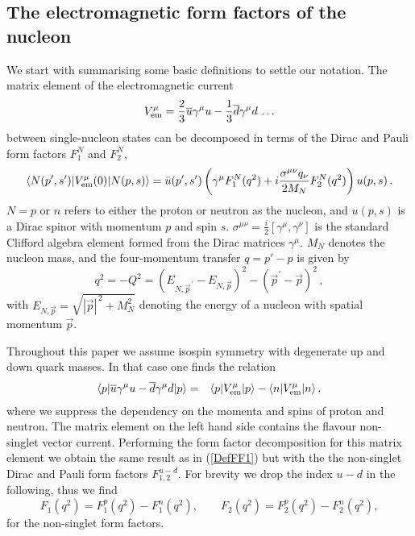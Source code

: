 \documentclass[11pt,prd,aps,showpacs,eqsecnum,floatfix,nofootinbib,preprint,tightenlines]{revtex4}
\newcommand{\pref}[1]{(\ref{#1})}
\begin{document}
\subsection{The electromagnetic form factors of the nucleon}
We start with summarising some basic definitions to settle our notation.
The matrix element of the electromagnetic current 
\begin{equation}
V^{\mu}_{\rm em} = \frac{2}{3} \overline{u}\gamma^{\mu}u - \frac{1}{3} \overline{d}\gamma^{\mu}d\,\ldots 
\end{equation}
between single-nucleon states can be decomposed in terms of the Dirac and Pauli form factors $F^N_1$ and $F^N_2$,
\begin{equation}\label{DefFF1}
\langle N(p',s')|V^{\mu}_{\rm em}(0)|N(p,s)\rangle = \bar{u}(p',s')\left(\gamma^{\mu}F^N_{1}(q^2) + i \frac{\sigma^{\mu\nu} q_{\nu}}{2M_N}F^N_2(q^2)\right)u(p,s)\,.
\end{equation}
$N=p$ or $n$ refers to either the proton or neutron as the nucleon, and $u(p,s)$ is a Dirac spinor with momentum $p$ and spin $s$. $\sigma^{\mu\nu}=\frac{i}{2}[\gamma^{\mu},\gamma^{\nu}]$ is the standard Clifford algebra element formed from the Dirac matrices $\gamma^{\mu}$. $M_N$ denotes the nucleon mass, and the four-momentum transfer $q=p'-p$ is given by 
\begin{equation}
q^2=-Q^2=(E_{N,\vec{p}^{\,\prime}} -  E_{N,\vec{p}})^2 - (\vec{p}^{\prime}-\vec{p})^2\,,
\end{equation}
with $E_{N,\vec{p}}=\sqrt{|\vec{p}|^{\,2} +M_N^2}$ denoting the  energy of a nucleon with spatial momentum $\vec{p}$.

Throughout this paper we assume isospin symmetry with degenerate up and down quark masses. In that case one finds the relation  
 \cite{Alexandrou:2017hac}
\begin{eqnarray}\label{VCME}
\langle p|  \overline{u}\gamma^{\mu}u - \overline{d}\gamma^{\mu}d | p\rangle 
&=& \langle p|V^{\mu}_{\rm em} | p\rangle - \langle n|V^{\mu}_{\rm em} | n\rangle\,,
\end{eqnarray}
where we suppress the dependency on the momenta and spins of proton and neutron. The matrix element on the left hand side contains the flavour non-singlet vector current.  Performing the form factor decomposition for this matrix element we obtain the same result as in \pref{DefFF1} but with the the non-singlet Dirac and Pauli form factors $F^{u-d}_{1,2}$. For brevity we drop the index $u-d$ in the following, thus we find
\begin{equation}
F_1(q^2) = F^p_1(q^2) - F^n_1(q^2),\qquad F_2(q^2) = F^p_2(q^2) - F^n_2(q^2),
\end{equation}
for the non-singlet form factors.
\end{document}

